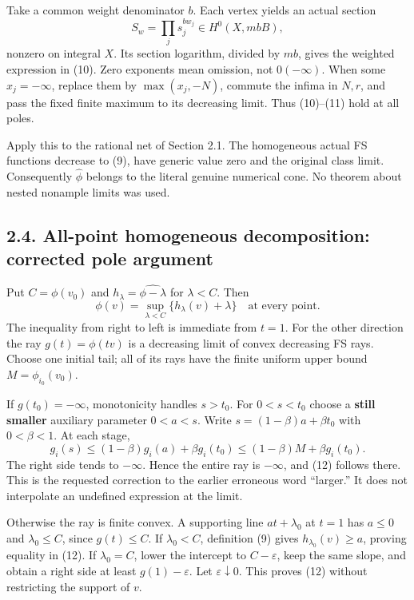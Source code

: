 \documentclass[
  10pt,
]{article}
\begin{document}
Take a common weight denominator \(b\). Each vertex yields an actual
section \[S_w=\prod_j s_j^{bw_j}\in H^0(X,mbB),\tag{11}\] nonzero on
integral \(X\). Its section logarithm, divided by \(mb\), gives the
weighted expression in (10). Zero exponents mean omission, not
\(0(-\infty)\). When some \(x_j=-\infty\), replace them by
\(\max(x_j,-N)\), commute the infima in \(N,r\), and pass the fixed
finite maximum to its decreasing limit. Thus (10)--(11) hold at all
poles.

Apply this to the rational net of Section 2.1. The homogeneous actual FS
functions decrease to (9), have generic value zero and the original
class limit. Consequently \(\widehat\phi\) belongs to the literal
genuine numerical cone. No theorem about nested nonample limits was
used.

\subsection{2.4. All-point homogeneous decomposition: corrected pole
argument}\label{all-point-homogeneous-decomposition-corrected-pole-argument}

Put \(C=\phi(v_0)\) and \(h_\lambda=\widehat{\phi-\lambda}\) for
\(\lambda<C\). Then
\[\phi(v)=\sup_{\lambda<C}\{h_\lambda(v)+\lambda\}\quad\text{at every point}.\tag{12}\]
The inequality from right to left is immediate from \(t=1\). For the
other direction the ray \(g(t)=\phi(tv)\) is a decreasing limit of
convex decreasing FS rays. Choose one initial tail; all of its rays have
the finite uniform upper bound \(M=\phi_{i_0}(v_0)\).

If \(g(t_0)=-\infty\), monotonicity handles \(s>t_0\). For \(0<s<t_0\)
choose a \textbf{still smaller} auxiliary parameter \(0<a<s\). Write
\(s=(1-\beta)a+\beta t_0\) with \(0<\beta<1\). At each stage,
\[g_i(s)\leq(1-\beta)g_i(a)+\beta g_i(t_0)
\leq(1-\beta)M+\beta g_i(t_0).\tag{13}\] The right side tends to
\(-\infty\). Hence the entire ray is \(-\infty\), and (12) follows
there. This is the requested correction to the earlier erroneous word
``larger.'' It does not interpolate an undefined expression at the
limit.

Otherwise the ray is finite convex. A supporting line \(at+\lambda_0\)
at \(t=1\) has \(a\leq0\) and \(\lambda_0\leq C\), since \(g(t)\leq C\).
If \(\lambda_0<C\), definition (9) gives \(h_{\lambda_0}(v)\geq a\),
proving equality in (12). If \(\lambda_0=C\), lower the intercept to
\(C-\varepsilon\), keep the same slope, and obtain a right side at least
\(g(1)-\varepsilon\). Let \(\varepsilon\downarrow0\). This proves (12)
without restricting the support of \(v\).
\end{document}
